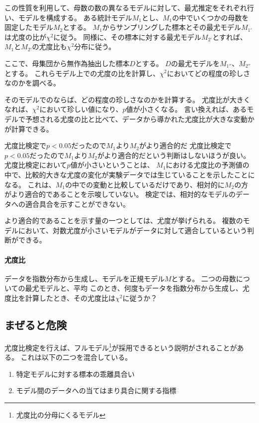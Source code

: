 
この性質を利用して、母数の数の異なるモデルに対して、最尤推定をそれぞれ行い、モデルを構成する。
ある統計モデル$M_1$とし、$M_1$の中でいくつかの母数を固定したモデル$M_2$とする。
$M_1$からサンプリングした標本とその最尤モデル$M_{1'}$は尤度の比が$\chi^2$に従う。
同様に、その標本に対する最尤モデル$M_{2'}$とすれば、$M_1$と$M_{2'}$の尤度比も$\chi^2$分布に従う。

ここで、母集団から無作為抽出した標本$D$とする。
$D$の最尤モデルを$M_{1''}$、$M_{2''}$とする。
これらモデル上での尤度の比を計算し、$\chi^2$においてどの程度の珍しさなのかを調べる。


そのモデルでのならば、どの程度の珍しさなのかを計算する。
尤度比が大きくなれば、$\chi^2$において珍しい値になり、$p$値が小さくなる。
言い換えれば、あるモデルで予想される尤度の比と比べて、データから導かれた尤度比が大きな変動かが計算できる。
\fi

\begin{SMbox}{尤度比検定で$p<0.05$だったので$M_1$より$M_2$がより適合的だ}
 尤度比検定で$p<0.05$だったので$M_1$より$M_2$がより適合的だという判断はしないほうが良い。
 尤度比検定において$p$値が小さいということは、
 $M_1$における尤度比の予測値の中で、比較的大きな尤度の変化が実験データでは生じていることを示したことになる。
 これは、$M_1$の中での変動と比較しているだけであり、相対的に$M_2$の方がより適合的であることを示唆していない。
 検定では、相対的なモデルのデータへの適合具合を示すことができない。

 より適合的であることを示す量の一つとしては、尤度が挙げられる。
 複数のモデルにおいて、対数尤度が小さいモデルがデータに対して適合しているという判断ができる。
\end{SMbox}



\paragraph{尤度比}
データを指数分布から生成し、モデルを正規モデル$M$とする。
二つの母数についての最尤モデルと、平均
このとき、何度もデータを指数分布から生成し、尤度比を計算したとき、その尤度比は$\chi^2$に従うか？
\fi

\subsection{まぜると危険}
尤度比検定を行えば、フルモデル\footnote{尤度比の分母にくるモデル}が採用できるという説明がされることがある。
これは以下の二つを混合している。
\begin{enumerate}
 \item 特定モデルに対する標本の乖離具合い
 \item モデル間のデータへの当てはまり具合に関する指標
\end{enumerate}

